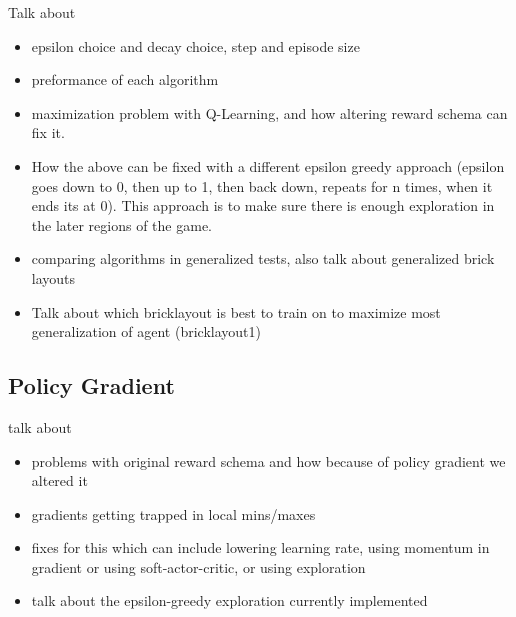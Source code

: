 \documentclass[twoside,11pt]{article}
\begin{document}
Talk about
\begin{itemize}
\item epsilon choice and decay choice, step and episode size
\item preformance of each algorithm
\item maximization problem with Q-Learning, and how altering reward schema can fix it.
\item How the above can be fixed with a different epsilon greedy approach (epsilon goes down to 0, then up to 1, then back down, repeats for n times, when it ends its at 0). This approach is to make sure there is enough exploration in the later regions of the game.
\item comparing algorithms in generalized tests, also talk about generalized brick layouts
\item Talk about which bricklayout is best to train on to maximize most generalization of agent (bricklayout1)
\end{itemize}

\subsection{Policy Gradient}
talk about
\begin{itemize}
\item problems with original reward schema and how because of policy gradient we altered it
\item gradients getting trapped in local mins/maxes
\item fixes for this which can include lowering learning rate, using momentum in gradient or using soft-actor-critic, or using exploration
\item talk about the epsilon-greedy exploration currently implemented
\end{itemize}



\end{document}
